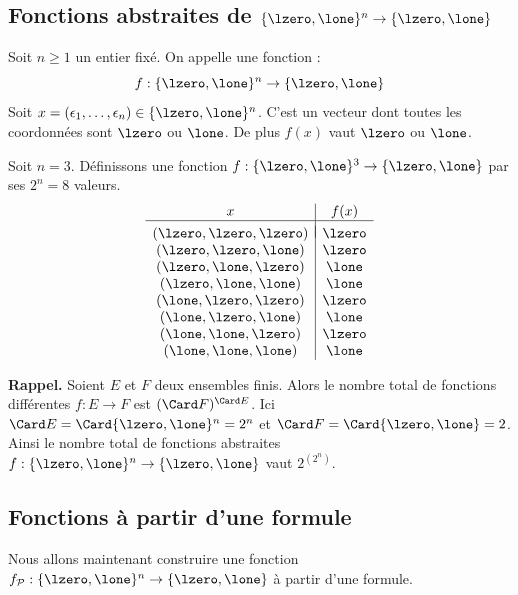 \documentclass[11pt,class=report,crop=false]{standalone}
\begin{document}
\subsection{Fonctions abstraites de $\{\lzero,\lone\}^n \to \{\lzero,\lone\}$}

Soit $n \ge 1$ un entier fixé.
On appelle  une fonction :
\[ 
f : \{\lzero,\lone\}^n \to \{\lzero,\lone\}
\]
Soit $x = (\epsilon_1,\ldots,\epsilon_n) \in \{\lzero,\lone\}^n$. C'est un vecteur dont toutes les coordonnées sont $\lzero$ ou $\lone$. De plus $f(x)$ vaut $\lzero$ ou $\lone$.

\begin{exemple}
Soit $n=3$. Définissons une fonction $f : \{\lzero,\lone\}^3 \to \{\lzero,\lone\}$ par ses $2^n=8$ valeurs.
\[
\begin{array}{c|c}
	x & f(x) \\
	\hline
	& \\[-2ex]
	(\lzero,\lzero,\lzero) & \lzero \\
	(\lzero,\lzero,\lone)  & \lzero \\
	(\lzero,\lone,\lzero)  & \lone \\
	(\lzero,\lone,\lone)   & \lone \\
	(\lone,\lzero,\lzero)  & \lzero \\
	(\lone,\lzero,\lone)   & \lone \\
	(\lone,\lone,\lzero)   & \lzero \\
	(\lone,\lone,\lone)    & \lone \\
\end{array}
\]
\end{exemple}

\textbf{Rappel.} Soient $E$ et $F$ deux ensembles finis. Alors le nombre total de fonctions différentes $f : E \to F$ est $(\Card F)^{\Card E}$.
Ici $\Card E = \Card \{\lzero,\lone\}^n = 2^n$ et $\Card F = \Card \{\lzero,\lone\} = 2$. Ainsi le nombre total de fonctions abstraites $f : \{\lzero,\lone\}^n \to \{\lzero,\lone\}$ vaut $2^{(2^n)}$.
 
 \subsection{Fonctions à partir d'une formule}

Nous allons maintenant construire une fonction $f_{\mathcal{P}} : \{\lzero,\lone\}^n \to \{\lzero,\lone\}$ à partir d'une formule.
\end{document}
